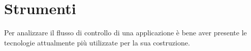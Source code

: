 \chapter{Strumenti}
Per analizzare il flusso di controllo di una applicazione è bene aver presente le tecnologie attualmente più utilizzate per la sua costruzione.